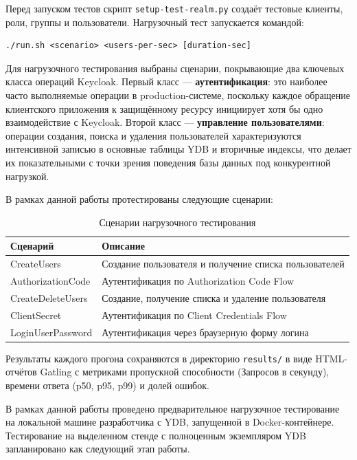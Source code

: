 \documentclass[times]{itmo-student-thesis}
\begin{document}
Перед запуском тестов скрипт \texttt{setup-test-realm.py} создаёт тестовые клиенты, роли, группы и пользователи.
Нагрузочный тест запускается командой:

\begin{verbatim}
./run.sh <scenario> <users-per-sec> [duration-sec]
\end{verbatim}

Для нагрузочного тестирования выбраны сценарии, покрывающие два ключевых
класса операций Keycloak.
Первый класс --- \textbf{аутентификация}: это наиболее часто выполняемые
операции в production-системе, поскольку каждое обращение клиентского
приложения к защищённому ресурсу инициирует хотя бы одно взаимодействие
с Keycloak.
Второй класс --- \textbf{управление пользователями}: операции создания,
поиска и удаления пользователей характеризуются интенсивной записью
в основные таблицы YDB и вторичные индексы, что делает их показательными
с точки зрения поведения базы данных под конкурентной нагрузкой.

В рамках данной работы протестированы следующие сценарии:

\begin{table}[H]
\centering
\begin{tabular}{|l|l|}
\hline
\textbf{Сценарий} & \textbf{Описание} \\
\hline
CreateUsers & Создание пользователя и получение списка пользователей \\
\hline
AuthorizationCode & Аутентификация по Authorization Code Flow \\
\hline
CreateDeleteUsers & Создание, получение списка и удаление пользователя \\
\hline
ClientSecret & Аутентификация по Client Credentials Flow \\
\hline
LoginUserPassword & Аутентификация через браузерную форму логина \\
\hline
\end{tabular}
\caption{Сценарии нагрузочного тестирования}
\end{table}

Результаты каждого прогона сохраняются в директорию \texttt{results/}
в виде HTML-отчётов Gatling с метриками пропускной способности (Запросов в секунду),
времени ответа (p50, p95, p99) и долей ошибок.

В рамках данной работы проведено предварительное нагрузочное тестирование
на локальной машине разработчика с YDB, запущенной в Docker-контейнере.
Тестирование на выделенном стенде с полноценным экземпляром YDB запланировано
как следующий этап работы.
\end{document}
